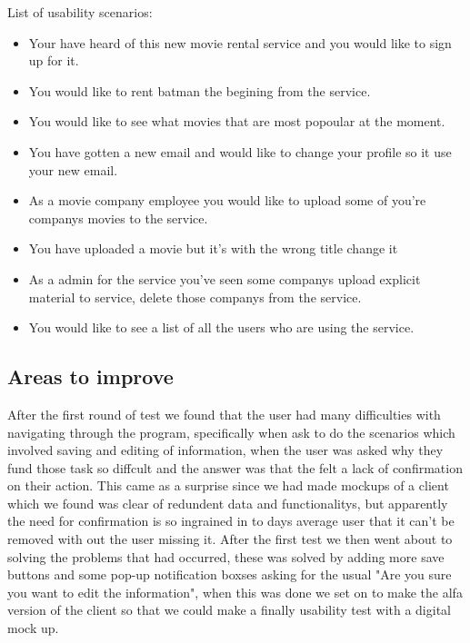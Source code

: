 List of usability scenarios:
\begin{itemize}
\item Your have heard of this new movie rental service and you would like to sign up for it.
\item You would like to rent batman the begining from the service.
\item You would like to see what movies that are most popoular at the moment.
\item You have gotten a new email and would like to change your profile so it use your new email.
\item As a movie company employee you would like to upload some of you're companys movies to the service.
\item You have uploaded a movie but it's with the wrong title change it
\item As a admin for the service you've seen some companys upload explicit material to service, delete those companys from the service.
\item  You would like to see a list of all the users who are using the service.
\end {itemize}

\subsection{Areas to improve}
\label{Design choices_Are to improve}
After the first round of test we found that the user had many difficulties with navigating through the program, specifically when ask to do the scenarios which involved saving and editing of information, when the user was asked why they fund those task so diffcult and the answer was that the felt a lack of confirmation on their action.
This came as a surprise since we had made  mockups of a client which we found was clear of redundent data and functionalitys, but apparently the need for confirmation is so ingrained in to days average user that it can't be removed with out the user missing it.
After the first test we then went about to solving the problems that had occurred, these was solved by adding more save buttons and some pop-up notification boxses asking for the usual "Are you sure you want to edit the information", when this was done we set on to make the alfa version of the client so that we could make a finally usability test with a digital mock up.










